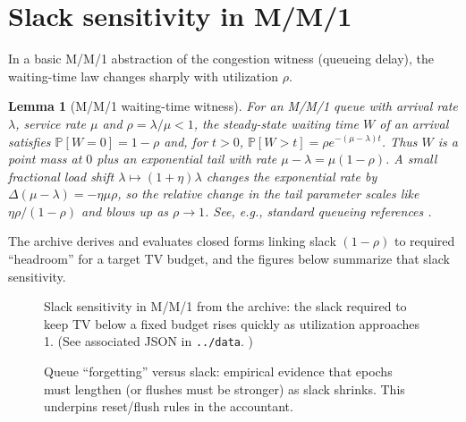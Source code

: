 \documentclass[11pt]{article}
\newtheorem{lemma}{Lemma}
\theoremstyle{definition}
\theoremstyle{remark}
\newcommand{\Prb}{\mathbb{P}}
\begin{document}
\section{Slack sensitivity in M/M/1}
In a basic M/M/1 abstraction of the congestion witness (queueing delay), the waiting-time law changes sharply with utilization $\rho$.

\begin{lemma}[M/M/1 waiting-time witness]\label{lem:mm1}
For an M/M/1 queue with arrival rate $\lambda$, service rate $\mu$ and $\rho=\lambda/\mu<1$, the steady-state waiting time $W$ of an arrival satisfies
$\Prb[W=0]=1-\rho$ and, for $t>0$, $\Prb[W>t]=\rho e^{-(\mu-\lambda)t}$.
Thus $W$ is a point mass at $0$ plus an exponential tail with rate $\mu-\lambda=\mu(1-\rho)$.
A small fractional load shift $\lambda\mapsto (1+\eta)\lambda$ changes the exponential rate by
$\Delta(\mu-\lambda)= -\eta\mu\rho$, so the \emph{relative} change in the tail parameter scales like $\eta\rho/(1-\rho)$ and blows up as $\rho\to 1$.
See, e.g., standard queueing references \cite{kendall1953,asmussen2003}.
\end{lemma}

The archive derives and evaluates closed forms linking slack $(1-\rho)$ to required ``headroom'' for a target TV budget, and the figures below summarize that slack sensitivity.

\begin{figure}[t]
\centering
{}
\caption{Slack sensitivity in M/M/1 from the archive: the slack required to keep TV below a fixed budget rises quickly as utilization approaches 1.
(See associated JSON in \texttt{../data}. )}
\label{fig:mm1slack}
\end{figure}

\begin{figure}[t]
\centering
{}
\caption{Queue ``forgetting'' versus slack: empirical evidence that epochs must lengthen (or flushes must be stronger) as slack shrinks.
This underpins reset/flush rules in the accountant.}
\label{fig:forgetting}
\end{figure}
\end{document}
